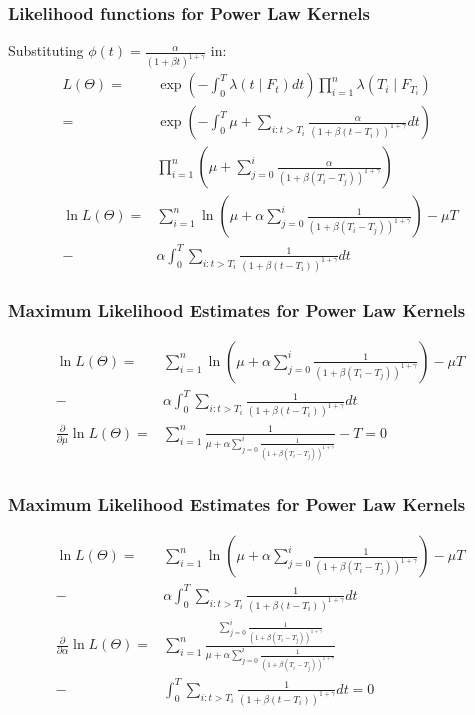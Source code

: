 \documentclass{beamer}
\begin{document}
\begin{frame}
\frametitle{Likelihood functions for Power Law Kernels}
Substituting $\phi(t) = \frac{\alpha}{(1 + \beta t)^{1 + \gamma}}$ in:
\begin{equation*}
\begin{split}
L(\Theta) = &\exp(-\int_{0}^{T} \lambda(t \mid F_t) dt) \prod_{i=1}^n \lambda(T_i \mid F_{T_{i}})\\
= &\exp(-\int_{0}^{T}  \mu + \sum_{i: t>T_i} \frac{\alpha}{(1 + \beta (t - T_i))^{1 + \gamma}} dt) \\
&\prod_{i=1}^n (\mu + \sum_{j=0}^i \frac{\alpha}{(1 + \beta (T_i - T_j))^{1 + \gamma}})\\[5mm]
\ln L(\Theta) = &\sum_{i=1}^n \ln(\mu + \alpha\sum_{j=0}^i \frac{1}{(1 + \beta (T_i - T_j))^{1 + \gamma}}) - \mu T\\
- &\alpha \int_{0}^{T} \sum_{i: t>T_i} \frac{1}{(1 + \beta (t - T_i))^{1 + \gamma}} dt
\end{split}
\end{equation*}
\end{frame}

\begin{frame}
\frametitle{Maximum Likelihood Estimates for Power Law Kernels}
\begin{equation*}
\begin{split}
\ln L(\Theta) = &\sum_{i=1}^n \ln(\mu + \alpha\sum_{j=0}^i \frac{1}{(1 + \beta (T_i - T_j))^{1 + \gamma}}) - \mu T\\
- &\alpha \int_{0}^{T} \sum_{i: t>T_i} \frac{1}{(1 + \beta (t - T_i))^{1 + \gamma}} dt\\[7mm]
\frac{\partial}{\partial \mu} \ln L(\Theta) = &\sum_{i=1}^n \frac{1}{\mu + \alpha\sum_{j=0}^i \frac{1}{(1 + \beta (T_i - T_j))^{1 + \gamma}}} - T = 0\\
\end{split}
\end{equation*}
\end{frame}

\begin{frame}
\frametitle{Maximum Likelihood Estimates for Power Law Kernels}
\begin{equation*}
\begin{split}
\ln L(\Theta) = &\sum_{i=1}^n \ln(\mu + \alpha\sum_{j=0}^i \frac{1}{(1 + \beta (T_i - T_j))^{1 + \gamma}}) - \mu T\\
- &\alpha \int_{0}^{T} \sum_{i: t>T_i} \frac{1}{(1 + \beta (t - T_i))^{1 + \gamma}} dt\\[7mm]
\frac{\partial}{\partial \alpha} \ln L(\Theta) = &\sum_{i=1}^n \frac{\sum_{j=0}^i \frac{1}{(1 + \beta (T_i - T_j))^{1 + \gamma}}}{\mu + \alpha\sum_{j=0}^i \frac{1}{(1 + \beta (T_i - T_j))^{1 + \gamma}}}\\
- &\int_{0}^{T} \sum_{i: t>T_i} \frac{1}{(1 + \beta (t - T_i))^{1 + \gamma}} dt = 0\\
\end{split}
\end{equation*}
\end{frame}
\end{document}
